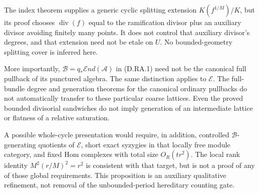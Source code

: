 \begin{remark}
The index theorem supplies a generic cyclic splitting
extension \(K(f^{1/M})/K\), but its proof chooses
\(\operatorname{div}(f)\) equal to the ramification
divisor plus an auxiliary divisor avoiding finitely
many points. It does not control that auxiliary
divisor's degrees, and that extension need not be
etale on \(U\). No bounded-geometry splitting cover
is inferred here.

More importantly, \(\mathcal B=q_*\mathcal End(\mathcal A)\)
in (D.RA.1) need not be the canonical full pullback
of its punctured algebra. The same distinction
applies to \(\mathcal E\).
The full-bundle degree and generation theorems
for the canonical ordinary pullbacks do not
automatically transfer to these particular
coarse lattices. Even the proved bounded
divisorial sandwiches do not imply generation
of an intermediate lattice or flatness of a
relative saturation.

A possible whole-cycle presentation would require,
in addition, controlled \(\mathcal B\)-generating
quotients of \(\mathcal E\), short exact syzygies
in that locally free module category, and fixed
Hom complexes with total size \(O_R(tr^2)\).
The local rank identity
\(M^2(r/M)^2=r^2\) is consistent with that target,
but is not a proof of any of those global
requirements. This proposition is an auxiliary
qualitative refinement, not removal of the
unbounded-period hereditary counting gate.
\end{remark}
